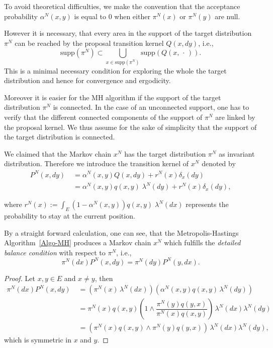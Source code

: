 To avoid theoretical difficulties, we make the convention that the acceptance probability $ \alpha^{N}(x,y) $ is equal to 0 when either $ \pi^{N}(x) $ or $ \pi^{N}(y) $ are null.

\begin{rem}
\label{Rem-SupportOfProposals}
However it is necessary, that every area in the support of the target distribution $ \pi^{N} $ can be reached by the proposal transition kernel $ Q(x,dy) $, i.e.,
\begin{equation*}
 \text{supp} (\pi^{N}) \subset \bigcup_{x \in \text{supp} (\pi^{N}) } \text{supp} (Q(x, \, \cdot \,)).
\end{equation*}
This is a minimal necessary condition for exploring the whole the target distribution and hence for convergence and ergodicity.

Moreover it is easier for the MH algorithm if the support of the target distribution $ \pi^{N} $ is connected. In the case of an unconnected support, one has to verify that the different connected components of the support of $ \pi^{N} $ are linked by the proposal kernel. We thus assume for the sake of simplicity that the support of the target distribution is connected.
 
\end{rem}


We claimed that the Markov chain $ x^{N} $ has the target distribution $ \pi^{N} $ as invariant distribution. Therefore we introduce the transition kernel of $ x^{N} $ denoted by
\begin{align}
\label{MH-TransitionKernelOfMHChain}
 P^{N}(x,dy) & \; = \alpha^{N}(x,y) Q(x, dy) + r^{N}(x)\delta_{x}(dy) \\
 & \; = \alpha^{N}(x,y) q(x,y) \; \lambda^{N}(dy) + r^{N}(x)\delta_{x}(dy),
\end{align}

where $ r^{N}(x):= \int_{E} \left( 1 - \alpha^{N}(x,y) \right) q(x,y) \; \lambda^{N}(dx) $ represents the probability to stay at the current position.

By a straight forward calculation, one can see, that the Metropolis-Hastings Algorithm~\ref{Algo-MH} produces a Markov chain $ x^{N} $ which fulfills the \emph{detailed balance condition} with respect to $ \pi^{N} $, i.e.,
\begin{equation}
 \pi^{N}(dx) P^{N}(x,dy) = \pi^{N}(dy) P^{N}(y,dx).
\end{equation}

\begin{proof}
 Let $ x, y \in E $ and $ x \ne y $, then
 \begin{align*}
  \pi^{N}(dx) P^{N}(x,dy) & \; = \left( \pi^{N}(x) \, \lambda^{N}(dx) \right)  \left( \alpha^{N}(x,y) q(x,y) \, \lambda^{N}(dy) \right) \\
  & \; = \pi^{N}(x)  q(x,y) \left( 1 \wedge \dfrac{\pi^{N}(y) q(y,x) }{\pi^{N}(x) q(x,y)} \right) \, \lambda^{N}(dx) \lambda^{N}(dy) \\
  & \; = \left( \pi^{N}(x)  q(x,y) \wedge \pi^{N}(y) q(y,x) \right) \, \lambda^{N}(dx) \lambda^{N}(dy),
 \end{align*}
 which is symmetric in $x$ and $y$.

\end{proof}

